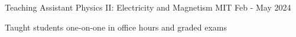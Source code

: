 

\begin{cventries}

\cventry
{Teaching Assistant} %
{Physics II: Electricity and Magnetism} %
{MIT} %
{Feb - May 2024} %
{
	\begin{cvitems} %
		\item{Taught students one-on-one in office hours and graded exams}
	\end{cvitems}
}
\end{cventries}
